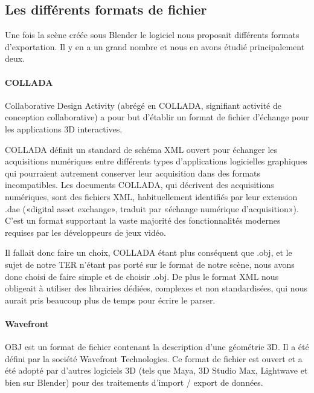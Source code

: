 \documentclass[a4paper,12pt]{report}
\begin{document}
\subsection{Les différents formats de fichier}

Une fois la scène créée sous Blender le logiciel nous proposait différents formats d'exportation. Il y en a un grand nombre et nous en avons étudié principalement deux.

\paragraph{COLLADA}

Collaborative Design Activity (abrégé en COLLADA, signifiant activité de conception collaborative) a pour but d'établir un format de fichier d'échange pour les applications 3D interactives.

COLLADA définit un standard de schéma XML ouvert pour échanger les acquisitions numériques entre différents types d'applications logicielles graphiques qui pourraient autrement conserver leur acquisition dans des formats incompatibles. Les documents COLLADA, qui décrivent des acquisitions numériques, sont des fichiers XML, habituellement identifiés par leur extension .dae («digital asset exchange», traduit par «échange numérique d'acquisition»).
C'est un format supportant la vaste majorité des fonctionnalités modernes
requises par les développeurs de jeux vidéo. 

Il fallait donc faire un choix, COLLADA étant plus conséquent que .obj, et le sujet de notre TER n'étant pas porté sur le format de notre scène, 
nous avons donc choisi de faire simple et de choisir .obj. De plus le format XML nous obligeait à utiliser des librairies dédiées, complexes et non standardisées, qui nous aurait pris beaucoup plus de temps pour écrire le parser.

\paragraph{Wavefront}

OBJ est un format de fichier contenant la description d'une géométrie 3D. Il a été défini par la société Wavefront Technologies. Ce format de fichier est ouvert et a été adopté par d'autres logiciels 3D (tels que Maya, 3D Studio Max, Lightwave et bien sur Blender) pour des traitements d'import / export de données.
\end{document}
